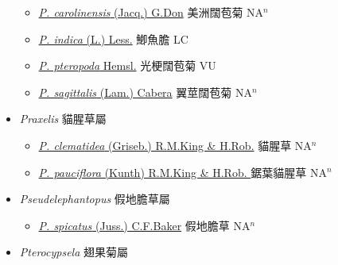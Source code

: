 \begin{itemize}
  \begin{itemize}
        \item[] \href{http://www.theplantlist.org/tpl1.1/search?q=Pluchea+carolinensis}{\textit{P. carolinensis} (Jacq.) G.Don}   美洲闊苞菊 NA$^n$
        \item[] \href{http://www.theplantlist.org/tpl1.1/search?q=Pluchea+indica}{\textit{P. indica} (L.) Less.}   鯽魚膽 LC
        \item[] \href{http://www.theplantlist.org/tpl1.1/search?q=Pluchea+pteropoda}{\textit{P. pteropoda} Hemsl.}   光梗闊苞菊 VU
        \item[] \href{http://www.theplantlist.org/tpl1.1/search?q=Pluchea+sagittalis}{\textit{P. sagittalis} (Lam.) Cabera}   翼莖闊苞菊 NA$^n$
  \end{itemize}
 \item[] \textit{Praxelis} 貓腥草屬
                    
  \begin{itemize}
        \item[] \href{http://www.theplantlist.org/tpl1.1/search?q=Praxelis+clematidea}{\textit{P. clematidea} (Griseb.) R.M.King \& H.Rob.}   貓腥草 NA$^n$
        \item[] \href{http://www.theplantlist.org/tpl1.1/search?q=Praxelis+pauciflora}{\textit{P. pauciflora} (Kunth) R.M.King \& H.Rob. }   鋸葉貓腥草 NA$^n$
  \end{itemize}
 \item[] \textit{Pseudelephantopus} 假地膽草屬
                    
  \begin{itemize}
        \item[] \href{http://www.theplantlist.org/tpl1.1/search?q=Pseudelephantopus+spicatus}{\textit{P. spicatus} (Juss.) C.F.Baker}   假地膽草 NA$^n$
  \end{itemize}
 \item[] \textit{Pterocypsela} 翅果菊屬
                    

\end{itemize}
